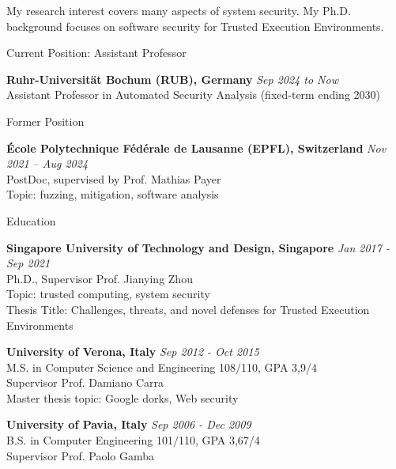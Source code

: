 \documentclass{resume} %
\begin{document}
	
My research interest covers many aspects of system security. My Ph.D. background
focuses on software security for Trusted Execution Environments.

\begin{rSection}{Current Position: Assistant Professor}
	
	{\bf Ruhr-Universität Bochum (RUB), Germany} 
	\hfill {\em Sep 2024 to Now} \\
	Assistant Professor in Automated Security Analysis (fixed-term ending 2030)

\end{rSection}

\begin{rSection}{Former Position}
	
	{\bf \'Ecole Polytechnique F\'ed\'erale de Lausanne (EPFL), Switzerland} 
	\hfill {\em Nov 2021 -- Aug 2024} \\
	PostDoc, supervised by Prof. Mathias Payer \\
	Topic: fuzzing, mitigation, software analysis

\end{rSection}


\begin{rSection}{Education}
    
{\bf Singapore University of Technology and Design, Singapore} \hfill {\em Jan
2017 - Sep 2021} \\
Ph.D., Supervisor Prof. Jianying Zhou \\
Topic: trusted computing, system security \\
Thesis Title: Challenges, threats, and novel defenses for Trusted Execution
Environments

{\bf University of Verona, Italy} \hfill {\em Sep 2012 - Oct 2015} \\
M.S. in Computer Science and Engineering 108$/$110, GPA 3,9/4 \\
Supervisor Prof. Damiano Carra \\
Master thesis topic: Google dorks, Web security


{\bf University of Pavia, Italy} \hfill {\em Sep 2006 - Dec 2009} \\ 
B.S. in Computer Engineering 101$/$110, GPA 3,67/4 \\
Supervisor Prof. Paolo Gamba \\


\end{rSection}
\end{document}
